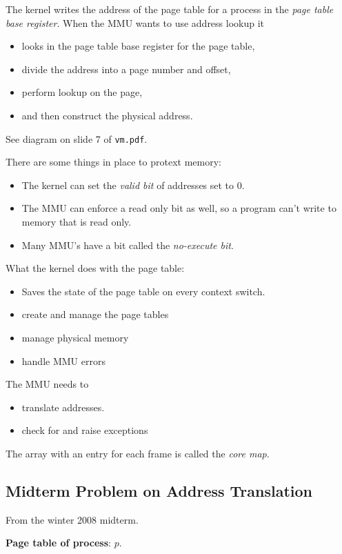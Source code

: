\documentclass[12pt]{article}
\begin{document}
The kernel writes the address of the page table for a process in the \emph{page table
base register}.  When the MMU wants to use address lookup it 
\begin{itemize}
	\item looks in the page table base register for the page table,
	\item divide the address into a page number and offset,
	\item perform lookup on the page,
	\item and then construct the physical address.
\end{itemize}
See diagram on slide 7 of \texttt{vm.pdf}.

There are some things in place to protext memory:
\begin{itemize}
	\item The kernel can set the \emph{valid bit} of addresses set to 0.
	\item The MMU can enforce a read only bit as well, so a program can't write
		to memory that is read only.
	\item Many MMU's have a bit called the \emph{no-execute bit}.
\end{itemize}

What the kernel does with the page table:
\begin{itemize}
	\item Saves the state of the page table on every context switch.
	\item create and manage the page tables
	\item manage physical memory
	\item handle MMU errors
\end{itemize}

The MMU needs to
\begin{itemize}
	\item translate addresses.
	\item check for and raise exceptions
\end{itemize}

The array with an entry for each frame is called the \emph{core map}.

\subsection{Midterm Problem on Address Translation}

From the winter 2008 midterm.

\textbf{Page table of process}: $p$.
\end{document}
